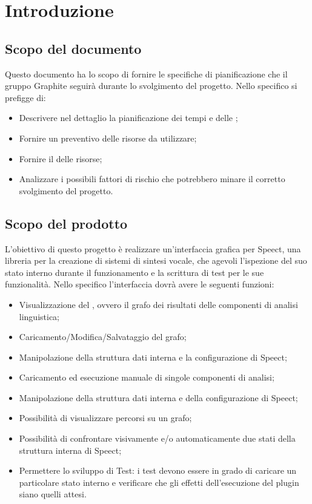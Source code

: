 \documentclass[./PianodiProgetto.tex]{subfiles}
\begin{document}
	
\chapter{Introduzione}
\section{Scopo del documento}
Questo documento ha lo scopo di fornire le specifiche di pianificazione che il gruppo Graphite seguirà durante lo svolgimento del progetto. Nello specifico si prefigge di:

\begin{itemize}
\item Descrivere nel dettaglio la pianificazione dei tempi e delle ;
\item Fornire un preventivo delle risorse da utilizzare;
\item Fornire il  delle risorse;
\item Analizzare i possibili fattori di rischio che potrebbero minare il corretto svolgimento del progetto.
\end{itemize}

\section{Scopo del prodotto}

L'obiettivo di questo progetto è realizzare un'interfaccia grafica per Speect, una libreria per la creazione di sistemi di sintesi vocale, che agevoli l'ispezione del suo stato interno durante il funzionamento e la scrittura di test per le sue funzionalità.
Nello specifico l'interfaccia dovrà avere le seguenti funzioni:
\begin{itemize}
\item Visualizzazione del , ovvero il grafo dei risultati delle componenti di analisi linguistica;
\item Caricamento/Modifica/Salvataggio del grafo;
\item Manipolazione della struttura dati interna e la configurazione di Speect;
\item Caricamento ed esecuzione manuale di singole componenti di analisi;
\item Manipolazione della struttura dati interna e della configurazione di Speect;
\item Possibilità di visualizzare percorsi su un grafo;
\item Possibilità di confrontare visivamente e/o automaticamente due stati della struttura interna di Speect;
\item Permettere lo sviluppo di Test: i test devono essere in grado di caricare un particolare stato interno e verificare che gli effetti dell’esecuzione del plugin siano quelli attesi.
\end{itemize}
\end{document}
